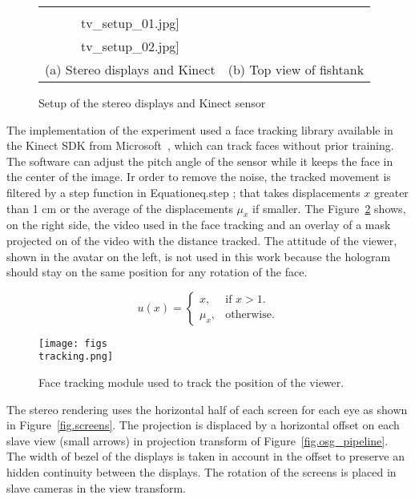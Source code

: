 \begin{figure}[!ht]
\centering
\begin{tabular}{cc}
\texttt{[image: figs\\tv\_setup\_01.jpg]}&
\texttt{[image: figs\\tv\_setup\_02.jpg]}\\
(a) Stereo displays and Kinect & 
(b) Top view of fishtank
\end{tabular}
\label{fig.tv_setup}
\caption{Setup of the stereo displays and Kinect sensor}
\end{figure}

The implementation of the experiment used a face tracking library available in the Kinect SDK from Microsoft~\cite{Zhang2012}, which can track faces without prior training. The software can adjust the pitch angle of the sensor while it keeps the face in the center of the image. Ir order to remove the noise, the tracked movement is filtered by a step function in Equation{eq.step} ; that takes displacements $x$ greater than 1 cm or the average of the displacements $\mu_x$ if smaller. The Figure~\ref{fig.tracking} shows, on the right side, the video used in the face tracking and an overlay of a mask projected on of the video with the distance tracked. The attitude of the viewer, shown in the avatar on the left, is not used in this work because the hologram should stay on the same position for any rotation of the face.

\begin{equation}
  u(x)=\begin{cases}
    x, & \text{if $x>1$}.\\
    \mu_{x}, & \text{otherwise}.
  \end{cases}
  \label{eq.step}
\end{equation}

\begin{figure}[!ht]
\centering
\texttt{[image: figs\\tracking.png]}
\label{fig.tracking}
\caption{Face tracking module used to track the position of the viewer.}
\end{figure}

The stereo rendering uses the horizontal half of each screen for each eye as shown in Figure~\ref{fig.screens}. The projection is displaced by a horizontal offset on each slave view (small arrows) in projection transform of Figure~\ref{fig.osg_pipeline}. The width of bezel of the displays is taken in account in the offset to preserve an hidden continuity between the displays. The rotation of the screens is placed in slave cameras in the view transform.

